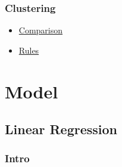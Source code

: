 \documentclass[]{book}
\theoremstyle{definition}
\theoremstyle{definition}
\theoremstyle{definition}
\theoremstyle{remark}
\begin{document}
\subsection{Clustering}\label{clustering}

\begin{itemize}
\item
  \href{http://scikit-learn.org/stable/modules/clustering.html\#clustering}{Comparison}
\item
  \href{https://twitter.com/thomaswdinsmore/status/965223193043718145}{Rules}
\end{itemize}

\chapter{Model}\label{model-2}

\section{Linear Regression}\label{linear-regression}

\subsection{Intro}\label{intro}
\end{document}

